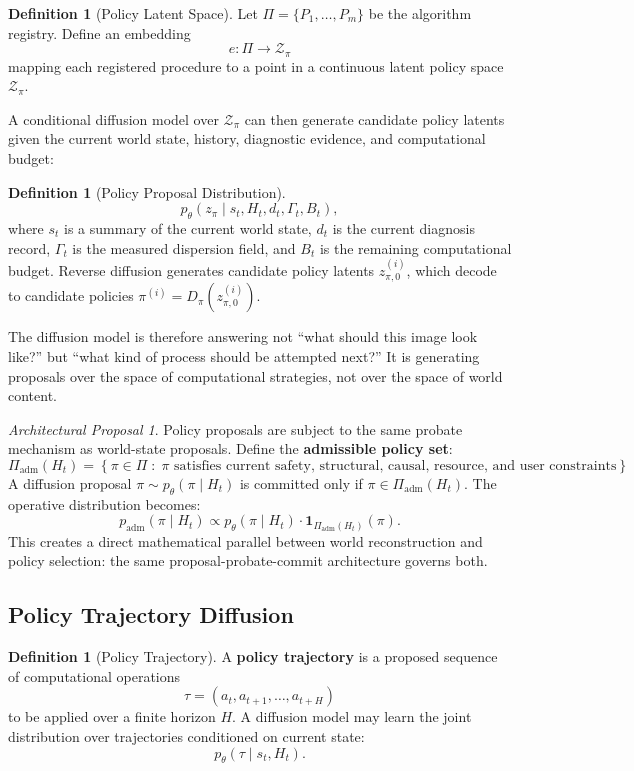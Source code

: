 \documentclass[11pt,a4paper]{article}
\theoremstyle{plain}
\theoremstyle{definition}
\newtheorem{definition}[theorem]{Definition}
\theoremstyle{remark}
\newtheorem{proposal}[theorem]{Architectural Proposal}
\begin{document}
\begin{definition}[Policy Latent Space]
Let $\Pi = \{P_1, \ldots, P_m\}$ be the algorithm registry. Define an embedding
\[
e : \Pi \to \mathcal{Z}_\pi
\]
mapping each registered procedure to a point in a continuous latent policy space $\mathcal{Z}_\pi$.
\end{definition}

A conditional diffusion model over $\mathcal{Z}_\pi$ can then generate candidate policy latents given the current world state, history, diagnostic evidence, and computational budget:

\begin{definition}[Policy Proposal Distribution]
\[
p_\theta(z_\pi \mid s_t, H_t, d_t, \Gamma_t, B_t),
\]
where $s_t$ is a summary of the current world state, $d_t$ is the current diagnosis record, $\Gamma_t$ is the measured dispersion field, and $B_t$ is the remaining computational budget. Reverse diffusion generates candidate policy latents $z_{\pi,0}^{(i)}$, which decode to candidate policies $\pi^{(i)} = D_\pi(z_{\pi,0}^{(i)})$.
\end{definition}

The diffusion model is therefore answering not ``what should this image look like?'' but ``what kind of process should be attempted next?'' It is generating proposals over the space of computational strategies, not over the space of world content.

\begin{proposal}
Policy proposals are subject to the same probate mechanism as world-state proposals. Define the \textbf{admissible policy set}:
\[
\Pi_{\mathrm{adm}}(H_t) = \left\{ \pi \in \Pi \;:\; \pi \text{ satisfies current safety, structural, causal, resource, and user constraints} \right\}.
\]
A diffusion proposal $\pi \sim p_\theta(\pi \mid H_t)$ is committed only if $\pi \in \Pi_{\mathrm{adm}}(H_t)$. The operative distribution becomes:
\[
p_{\mathrm{adm}}(\pi \mid H_t) \propto p_\theta(\pi \mid H_t) \cdot \mathbf{1}_{\Pi_{\mathrm{adm}}(H_t)}(\pi).
\]
This creates a direct mathematical parallel between world reconstruction and policy selection: the same proposal-probate-commit architecture governs both.
\end{proposal}

\subsection{Policy Trajectory Diffusion}

\begin{definition}[Policy Trajectory]
A \textbf{policy trajectory} is a proposed sequence of computational operations
\[
\tau = (a_t, a_{t+1}, \ldots, a_{t+H})
\]
to be applied over a finite horizon $H$. A diffusion model may learn the joint distribution over trajectories conditioned on current state:
\[
p_\theta(\tau \mid s_t, H_t).
\]
\end{definition}
\end{document}
